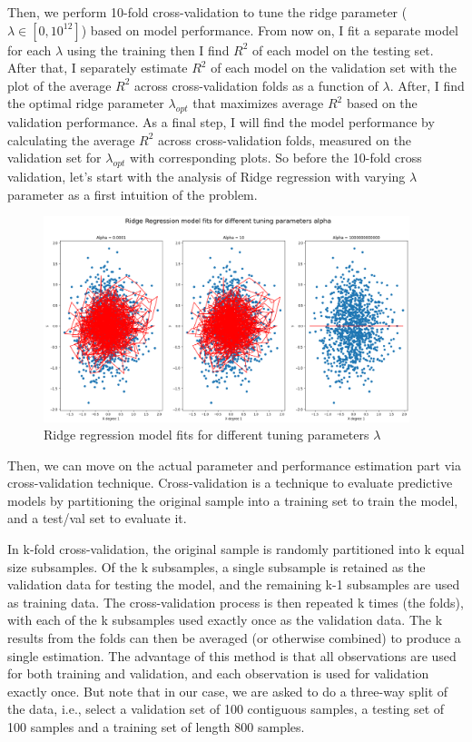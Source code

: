 \documentclass[12pt]{amsart}
\begin{document}
Then, we perform 10-fold cross-validation to tune the ridge parameter ($\lambda \in [0,10^{12}]$) based on model performance. From now on, I fit a separate model for each $\lambda$ using the training then I find $R^2$ of each model on the testing set. After that, I separately estimate $R^2$ of each model on the validation set with the plot of the average $R^2$ across cross-validation folds as a function of $\lambda$. After, I find the optimal ridge parameter $\lambda_{opt}$ that maximizes average $R^2$ based on the validation performance. As a final step, I will find the model performance by calculating the average $R^2$ across cross-validation folds, measured on the validation set for $\lambda_{opt}$ with corresponding plots. So before the 10-fold cross validation, let's start with the analysis of Ridge regression with varying $\lambda$ parameter as a first intuition of the problem.

\begin{figure}[h]
    \centering
    \includegraphics[width = 0.95\textwidth]{images/1.png}
    \caption{Ridge regression model fits for different tuning parameters $\lambda$}
\end{figure}

Then, we can move on the actual parameter and performance estimation  part via cross-validation technique. Cross-validation is a technique to evaluate predictive models by partitioning the original sample into a training set to train the model, and a test/val set to evaluate it.

\bigskip
In k-fold cross-validation, the original sample is randomly partitioned into k equal size subsamples. Of the k subsamples, a single subsample is retained as the validation data for testing the model, and the remaining k-1 subsamples are used as training data. The cross-validation process is then repeated k times (the folds), with each of the k subsamples used exactly once as the validation data. The k results from the folds can then be averaged (or otherwise combined) to produce a single estimation. The advantage of this method is that all observations are used for both training and validation, and each observation is used for validation exactly once. But note that in our case, we are asked to do a three-way split of the data, i.e.,  select a validation set of 100 contiguous samples, a testing set of 100 samples and a training set of length 800 samples.
\end{document}

